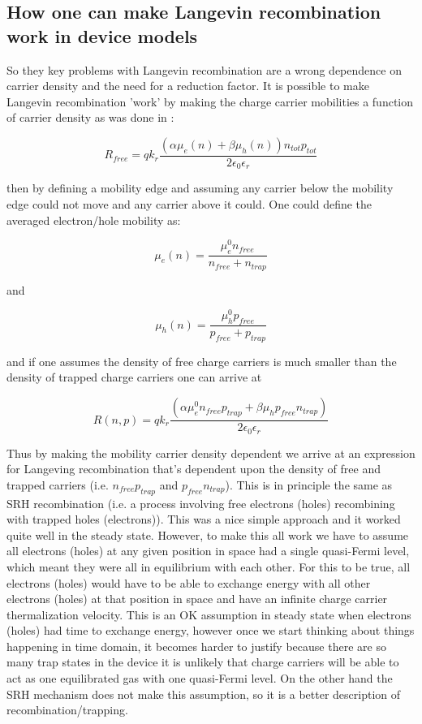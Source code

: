 \subsection{How one can make Langevin recombination work in device models}
So they key problems with Langevin recombination are a wrong dependence on carrier density and the need for a reduction factor. It is possible to make Langevin recombination 'work' by making the charge carrier mobilities a function of carrier density as was done in \cite{mackenzie2011modeling}:

\begin{equation}
R_{free}=q k_{r}\frac{(\alpha \mu_e(n)+\beta \mu_h(n)) n_{tot} p_{tot}}{2\epsilon_0\epsilon_r}
\end{equation}

then by defining a mobility edge and assuming any carrier below the mobility edge could not move and any carrier above it could.  One could define the averaged electron/hole mobility as: 

\begin{equation}
\mu_e(n)=\frac{\mu_e^0 n_{free}}{n_{free}+n_{trap}}
\end{equation}

and

\begin{equation}
\mu_h(n)=\frac{\mu_h^0 p_{free}}{p_{free}+p_{trap}}
\end{equation}

and if one assumes the density of free charge carriers is much smaller than the density of trapped charge carriers one can arrive at

\begin{equation}
R(n,p)=q k_{r}\frac{(\alpha \mu_e^0 n_{free} p_{trap}+\beta \mu_h p_{free} n_{trap}) }{2\epsilon_0\epsilon_r}
\end{equation}

Thus by making the mobility carrier density dependent we arrive at an expression for Langeving recombination that's dependent upon the density of free and trapped carriers (i.e. $n_{free} p_{trap}$ and $ p_{free} n_{trap}$). This is in principle the same as SRH recombination (i.e. a process involving free electrons (holes) recombining with trapped holes (electrons)).  This was a nice simple approach and it worked quite well in the steady state.  However, to make this all work we have to assume all electrons (holes) at any given position in space had a single quasi-Fermi level, which meant they were all in equilibrium with each other.  For this to be true, all electrons (holes) would have to be able to exchange energy with all other electrons (holes) at that position in space and have an infinite charge carrier thermalization velocity.  This is an OK assumption in steady state when electrons (holes) had time to exchange energy, however once we start thinking about things happening in time domain, it becomes harder to justify because there are so many trap states in the device it is unlikely that charge carriers will be able to act as one equilibrated gas with one quasi-Fermi level.  On the other hand the SRH mechanism does not make this assumption, so it is a better description of recombination/trapping.



